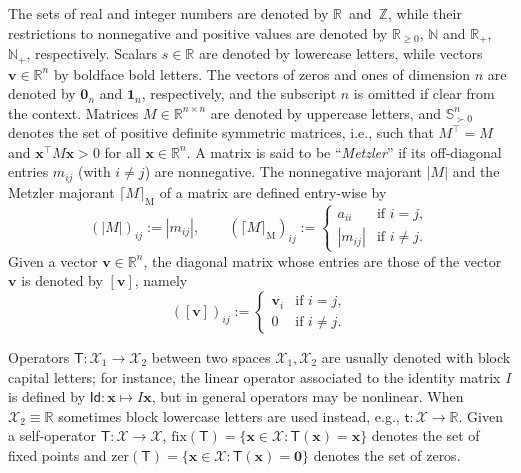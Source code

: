 \documentclass[journal,twoside,web]{ieeecolor}
\newcommand{\virg}[1]{``#1''}
\newcommand{\mzr}[1]{\lceil#1\rceil_{\text{M}}}
\newcommand{\abs}[1]{{\left\vert #1 \right\vert}}
\newcommand{\rea }{\mathbb{R}}
\newcommand{\nat}{\mathbb{N}}
\newcommand{\xb}{\boldsymbol{x}}
\newcommand{\vb}{\boldsymbol{v}}
\newcommand{\Xc}{\mathcal{X}}
\newcommand{\Ts}{\mathsf{T}}
\newcommand{\ts}{\mathsf{t}}
\newcommand{\Is}{\mathsf{Id}}
\newcommand{\bone}{\boldsymbol{1}}
\newcommand{\bzero}{\boldsymbol{0}}
\newcommand{\fix}{\mathrm{fix}}
\newcommand{\zer}{\mathrm{zer}}
\begin{document}
The sets of real and integer numbers are
denoted by $\rea$~and~$\mathbb{Z}$, while their restrictions to nonnegative and positive values are denoted by $\rea_{\geq 0}$, $\nat$ and $\rea_+$, $\nat_+$, respectively.
%
Scalars $s\in\mathbb{R}$ are denoted by lowercase letters, while vectors $\vb\in\mathbb{R}^n$ by boldface bold letters. The vectors of zeros and ones of dimension $n$ are denoted by $\bzero_n$ and $\bone_n$, respectively, and the subscript $n$ is omitted if clear from the context.
%
Matrices ${M\in \mathbb{R}^{n\times n}}$ are denoted by uppercase letters, and $\mathbb{S}^n_{\succ 0}$ denotes the set of positive definite symmetric matrices, i.e., such that $M^\top = M$ and $\xb^\top M \xb > 0$ for all $\xb\in\rea^n$.
%
A matrix is said to be \virg{\textit{Metzler}} if its off-diagonal entries $m_{ij}$ (with $i\neq j$) are nonnegative. 
%
The nonnegative majorant $\abs{M}$ and the Metzler majorant $\mzr{M}$ of a matrix are defined entry-wise by 
%
\begin{equation}\label{eq:majorant}
        (\abs{M})_{ij} := \abs{m_{ij}},\qquad  (\mzr{M})_{ij} := \begin{cases}
    a_{ii} & \text{if } i=j,\\
    \abs{m_{ij}} & \text{if } i\neq j.
    \end{cases}
\end{equation}
%
Given a vector $\vb\in\rea^n$, the diagonal matrix whose entries are those of the vector $\vb$ is denoted by $[\vb]$, namely
%
\begin{equation}\label{eq:diag_weight}
    ([\vb])_{ij} := \begin{cases}
    \vb_i & \text{if } i=j,\\
    0 & \text{if } i\neq j.
    \end{cases}
\end{equation}

Operators $\Ts:\Xc_1\rightarrow\Xc_2$ between two spaces $\Xc_1,\Xc_2$ are usually denoted with block capital letters; for instance, the linear operator associated to the identity matrix $I$ is defined by $\Is:\xb \mapsto I\xb$, but in general operators may be nonlinear. When $\Xc_2\equiv \rea$ sometimes block lowercase letters are used instead, e.g., $\ts:\Xc\rightarrow\rea$.
%
Given a self-operator $\Ts:\Xc\rightarrow\Xc$, $\fix (\Ts)=\{\xb\in\Xc:\Ts(\xb)=\xb\}$ denotes the set of fixed points and $\zer (\Ts)=\{\xb\in\Xc:\Ts(\xb)=\bzero\}$ denotes the set of zeros.
%
\end{document}
